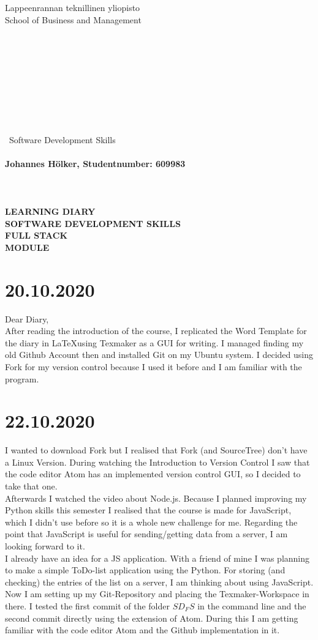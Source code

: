 \documentclass{article}
\begin{document}
\begin{Large}
Lappeenrannan teknillinen yliopisto\\
School of Business and Management
\\\\\\\\\\\\\\\\\\\\\
Software Development Skills\\\\
\textbf{Johannes Hölker, Studentnumber: 609983}\\\\\\\\
\textbf{LEARNING DIARY\\ SOFTWARE DEVELOPMENT SKILLS\\ FULL STACK\\MODULE}
\end{Large}

\newpage 


\tableofcontents

\newpage

\section{20.10.2020} 
Dear Diary,\\
After reading the introduction of the course, I replicated the Word Template for the diary in \LaTeX using Texmaker as a GUI for writing. I managed finding my old Github Account then and installed Git on my Ubuntu system. I decided using Fork for my version control because I used it before and I am familiar with the program.
\section{22.10.2020}
I wanted to download Fork but I realised that Fork (and SourceTree) don't have a Linux Version. During watching the Introduction to Version Control I saw that the code editor Atom has an implemented version control GUI, so I decided to take that one.\\
Afterwards I watched the video about Node.js. Because I planned improving my Python skills this semester I realised that the course is made for JavaScript, which I didn't use before so it is a whole new challenge for me. Regarding the point that JavaScript is useful for sending/getting data from a server, I am looking forward to it.\\
I already have an idea for a JS application. With a friend of mine I was planning to make a simple ToDo-list application using the Python. For storing (and checking) the entries of the list on a server, I am thinking about using JavaScript.\\
Now I am setting up my Git-Repository and placing the Texmaker-Workspace in there. I tested the first commit of the folder $SD_FS$ in the command line and the second commit directly using the extension of Atom. During this I am getting familiar with the code editor Atom and the Github implementation in it.
\end{document}
